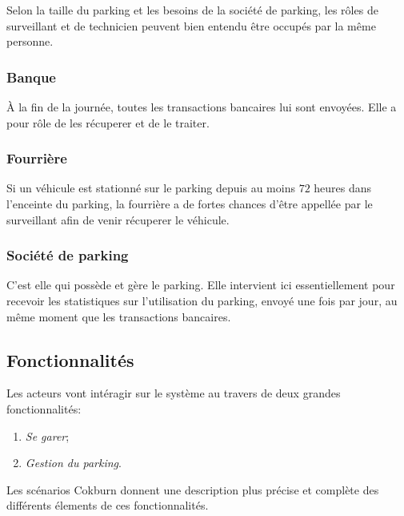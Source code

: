 \documentclass[a4paper]{article}
\begin{document}
Selon la taille du parking et les besoins de la soci\'et\'e de parking, les r\^oles
de surveillant et de technicien peuvent bien entendu \^etre occup\'es par la m\^eme
personne.

\subsubsection{Banque}
\`A la fin de la journ\'ee, toutes les transactions bancaires lui sont envoy\'ees. Elle
a pour r\^ole de les r\'ecuperer et de le traiter.

\subsubsection{Fourri\`ere}
Si un v\'ehicule est stationn\'e sur le parking depuis au moins $72$ heures dans l'enceinte
du parking, la fourri\`ere a de fortes chances d'\^etre appell\'ee par le surveillant afin
de venir r\'ecuperer le v\'ehicule.

\subsubsection{Soci\'et\'e de parking}
C'est elle qui poss\`ede et g\`ere le parking. Elle intervient ici essentiellement pour
recevoir les statistiques sur l'utilisation du parking, envoy\'e une fois par jour, au
m\^eme moment que les transactions bancaires.

\subsection{Fonctionnalit\'es}
Les acteurs vont int\'eragir sur le syst\`eme au travers de deux grandes fonctionnalit\'es:
\begin{enumerate}
	\item \textit{Se garer};
	\item \textit{Gestion du parking}.
\end{enumerate}


Les sc\'enarios Cokburn donnent une description plus pr\'ecise et compl\`ete des diff\'erents
\'elements de ces fonctionnalit\'es.
\end{document}
